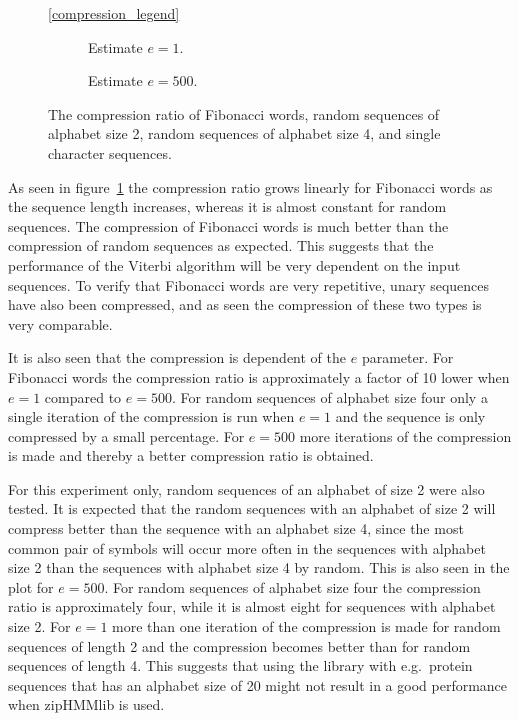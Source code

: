 \begin{figure}
  \centering\ref{compression_legend}
  \begin{subfigure}[b]{0.5\textwidth}
    \centering 
    \caption{Estimate $e = 1$.}
  \end{subfigure}\hspace{-5mm}%
  \begin{subfigure}[b]{0.5\textwidth}
    \centering 
    \caption{Estimate $e = 500$.}
  \end{subfigure}
  \caption{The compression ratio of Fibonacci words, random sequences of
    alphabet size 2, random sequences of alphabet size 4, and single character
    sequences.}
  \label{fig:compression_ratio}
\end{figure}

As seen in figure~\ref{fig:compression_ratio} the compression ratio grows
linearly for Fibonacci words as the sequence length increases, whereas it
is almost constant for random sequences. The compression of Fibonacci
words is much better than the compression of random sequences as
expected. This suggests that the performance of the Viterbi algorithm will be
very dependent on the input sequences. To verify that Fibonacci words
are very repetitive, unary sequences have also been compressed, and as seen the
compression of these two types is very comparable.

It is also seen that the compression is dependent of the $e$ parameter.
For Fibonacci words the compression ratio is approximately a factor of 10 lower when
$e = 1$ compared to $e = 500$. For random sequences of alphabet size four only
a single iteration of the compression is run when $e = 1$ and the sequence is
only compressed by a small percentage. For $e = 500$ more iterations of the
compression is made and thereby a better compression ratio is obtained.

For this experiment only, random sequences of an alphabet of size 2 were also
tested. It is expected that the random sequences with an alphabet of size 2
will compress better than the sequence with an alphabet size 4, since the most
common pair of symbols will occur more often in the sequences with alphabet
size 2 than the sequences with alphabet size 4 by random. This is also seen in
the plot for $e = 500$. For random sequences of alphabet size four the
compression ratio is approximately four, while it is almost eight for sequences
with alphabet size 2. For $e = 1$ more than one iteration of the compression is
made for random sequences of length 2 and the compression becomes better than
for random sequences of length 4. This suggests that using the library with
e.g.\ protein sequences that has an alphabet size of 20 might not result in a
good performance when zipHMMlib is used.

